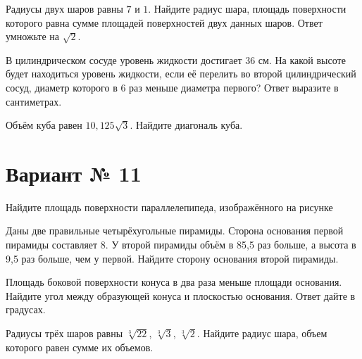 \documentclass[4apaper]{article}
\begin{document}
\begin{taskBN}{4}
Радиусы двух шаров равны $7$ и $1$. Найдите радиус шара, площадь поверхности которого равна сумме площадей поверхностей двух данных шаров. Ответ умножьте на $\sqrt{2}$.
\end{taskBN}

\begin{taskBN}{5}
В цилиндрическом сосуде уровень жидкости достигает 36 см. На какой высоте будет находиться уровень жидкости, если её перелить во второй цилиндрический сосуд, диаметр которого в 6 раз меньше диаметра первого? Ответ выразите в сантиметрах.
\end{taskBN}

\begin{taskBN}{6}
Объём куба равен $10,125\sqrt{3}$. Найдите диагональ куба.
\end{taskBN}
\newpage\section*{Вариант № 11}

\begin{taskBN}{1}
Найдите площадь поверхности параллелепипеда, изображённого на рисунке
\end{taskBN}
\vspace*{1cm}

\begin{taskBN}{2}
Даны две правильные четырёхугольные пирамиды. Сторона основания первой пирамиды составляет 8. У второй пирамиды объём в 85,5 раз больше, а высота в 9,5 раз больше, чем у первой. Найдите сторону основания второй пирамиды.
\end{taskBN}

\begin{taskBN}{3}
Площадь боковой поверхности конуса в два раза меньше площади основания. Найдите угол между образующей конуса и плоскостью основания. Ответ дайте в градусах.
\end{taskBN}

\begin{taskBN}{4}
Радиусы трёх шаров равны $\sqrt[3]{22}$, $\sqrt[3]{3}$, $\sqrt[3]{2}$. Найдите радиус шара, объем которого равен сумме их объемов.
\end{taskBN}
\end{document}
